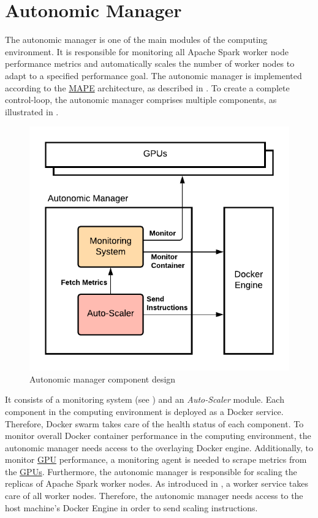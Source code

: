 \section{Autonomic Manager}
\label{05_am}
The autonomic manager is one of the main modules of the computing environment.
It is responsible for monitoring all Apache Spark worker node performance metrics and automatically scales the number of worker nodes to adapt to a specified performance goal.
The autonomic manager is implemented according to the \hyperlink{abbr:mape}{MAPE} architecture, as described in . To create a complete control-loop, the autonomic manager comprises multiple components, as illustrated in .
\label{subsec:05_am}
\begin{figure}[h]
\centering
\includegraphics[scale=1]{images/05_conceptual_design/autonomic_manager/autonomic_manager_concept}
\caption{Autonomic manager component design}
\label{fig:05_am_concept}
\end{figure}
It consists of a monitoring system (see ) and an \textit{Auto-Scaler} module.
Each component in the computing environment is deployed as a Docker service. Therefore, Docker swarm takes care of the health status of each component.
To monitor overall Docker container performance in the computing environment, the autonomic manager needs access to the overlaying Docker engine. Additionally, to monitor \hyperlink{abbr:gpu}{GPU} performance, a monitoring agent is needed to scrape metrics from the \hyperlink{abbr:gpu}{GPUs}.
Furthermore, the autonomic manager is responsible for scaling the replicas of Apache Spark worker nodes. As introduced in , a worker service takes care of all worker nodes. Therefore, the autonomic manager needs access to the host machine's Docker Engine in order to send scaling instructions.



